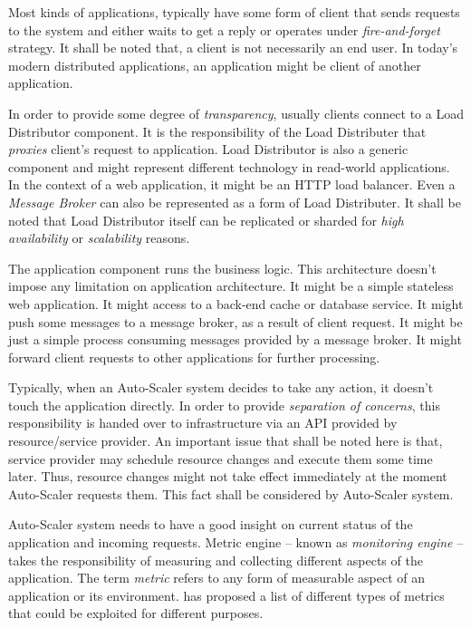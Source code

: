 \begin{description}[leftmargin=0pt]
    \item[Clients] Most kinds of applications, typically have some form of client that sends requests to the system and either waits to get a reply or operates under \emph{fire-and-forget} strategy. It shall be noted that, a client is not necessarily an end user. In today's modern distributed applications, an application might be client of another application.
    \item[Load Distributor] In order to provide some degree of \emph{transparency}, usually clients connect to a Load Distributor component. It is the responsibility of the Load Distributer that \emph{proxies} client's request to application. Load Distributor is also a generic component and might represent different technology in read-world applications. In the context of a web application, it might be an HTTP load balancer. Even a \emph{Message Broker} can also be represented as a form of Load Distributer. It shall be noted that Load Distributor itself can be replicated or sharded for \emph{high availability} or \emph{scalability} reasons.
    \item[Application] The application component runs the business logic. This architecture doesn't impose any limitation on application architecture. It might be a simple stateless web application. It might access to a back-end cache or database service. It might push some messages to a message broker, as a result of client request. It might be just a simple process consuming messages provided by a message broker. It might forward client requests to other applications for further processing.
    \item[Infrastructure] Typically, when an Auto-Scaler system decides to take any action, it doesn't touch the application directly. In order to provide \emph{separation of concerns}, this responsibility is handed over to infrastructure via an API provided by resource/service provider. An important issue that shall be noted here is that, service provider may schedule resource changes and execute them some time later. Thus, resource changes might not take effect immediately at the moment Auto-Scaler requests them. This fact shall be considered by Auto-Scaler system.
    \item[Metric Engine] Auto-Scaler system needs to have a good insight on current status of the application and incoming requests. Metric engine -- known as \emph{monitoring engine} -- takes the responsibility of measuring and collecting different aspects of the application. The term \emph{metric} refers to any form of measurable aspect of an application or its environment. \textcite{Ghanbari:2011} has proposed a list of different types of metrics that could be exploited for different purposes.

\end{description}
